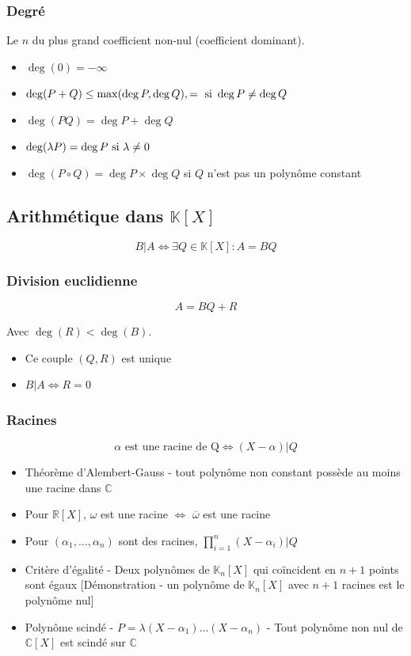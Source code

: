 \documentclass[openany]{book}
\begin{document}
\subsubsection{Degré}
Le $n$ du plus grand coefficient non-nul (coefficient dominant).
\begin{itemize}
    \item $ \deg(0) = - \infty$
    \item $ \deg (P + Q) \leq \max(\deg P, \deg Q) , = \text{ si } \deg P \neq \deg Q $
    \item $ \deg (PQ) = \deg P + \deg Q $
    \item $ \deg (\lambda P) = \deg P \text{ si } \lambda \neq 0 $
    \item $ \deg (P \circ Q) = \deg P \times \deg Q $ si $Q$ n'est pas un polynôme constant
\end{itemize}

\subsection{Arithmétique dans $\mathbb{K}[X]$}
\[ B|A \iff \exists Q \in \mathbb{K}[X] : A = BQ \]

\subsubsection{Division euclidienne}
\[ A = BQ + R \]

\noindent Avec $\deg (R) < \deg(B)$.

\begin{itemize}
    \item Ce couple $(Q, R)$ est unique
    \item $B | A \iff R = 0$
\end{itemize}

\subsubsection{Racines}
\[ \alpha \text{ est une racine de Q} \iff (X-\alpha)|Q \]

\begin{itemize}
    \item Théorème d'Alembert-Gauss - tout polynôme non constant possède au moins une racine dans $\mathbb{C}$
    \item Pour $\mathbb{R}[X]$, $\omega$ est une racine $\iff$ $\overline{\omega}$ est une racine
    \item Pour $(\alpha_1,\dots,\alpha_n)$ sont des racines, $\prod_{i=1}^n (X-\alpha_i) | Q$
    \item Critère d'égalité - Deux polynômes de $\mathbb{K}_n [X]$ qui coïncident en $n+1$ points sont égaux [Démonstration - un polynôme de $\mathbb{K}_n [X]$ avec $n+1$ racines est le polynôme nul]
    \item Polynôme scindé - $P = \lambda (X-\alpha_1)\dots(X-\alpha_n)$ - Tout polynôme non nul de $\mathbb{C}[X]$ est scindé sur $\mathbb{C}$
\end{itemize}
\end{document}
